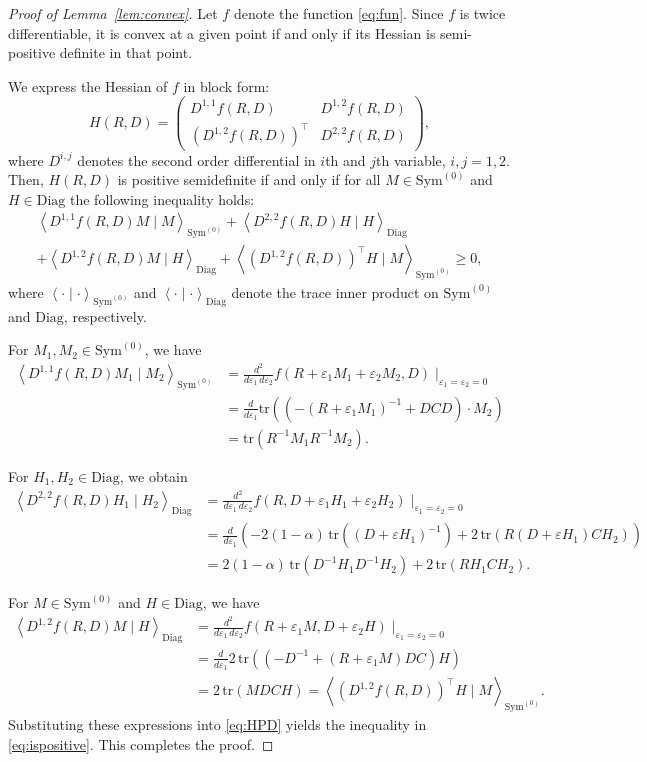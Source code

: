 \documentclass[12pt]{amsart}
\numberwithin{equation}{section}
\numberwithin{equation}{section}
\theoremstyle{plain}
\theoremstyle{definition}
\newcommand{\tr}{\mathrm{tr}}
\newcommand{\Szero}{\mathrm{Sym}^{(0)}}
\newcommand{\Diag}{\mathrm{Diag}}
\begin{document}
\begin{proof}[Proof of Lemma~\ref{lem:convex}]

Let $f$ denote the function \eqref{eq:fun}. Since $f$ is twice differentiable, it is convex at a given point if and only if its Hessian is semi-positive definite in that point. 

We express the Hessian of $f$ in block form:
\[
H(R,D) = \begin{pmatrix}
    D^{1,1} f(R,D) & D^{1,2} f(R,D) \\
    (D^{1,2} f(R,D))^\top  & D^{2,2} f(R,D)
\end{pmatrix},
\]
where $D^{i,j}$ denotes the second order differential in $i$th and $j$th variable, $i,j=1,2$. Then, $H(R,D)$ is positive semidefinite if and only if for all $M\in \Szero$ and $H\in \Diag$ the following inequality holds:
\begin{multline}\label{eq:HPD}
\left< D^{1,1} f(R,D) M\mid M\right>_{\Szero}+\left< D^{2,2} f(R,D) H\mid H\right>_{\Diag} \\
+ \left< D^{1,2} f(R,D) M\mid H\right>_{\Diag}+
\left< (D^{1,2} f(R,D))^\top H\mid M\right>_{\Szero}
\geq 0,
\end{multline}
where $\left<\cdot\mid\cdot\right>_{\Szero}$ and $\left<\cdot\mid\cdot\right>_{\Diag}$ denote the trace inner product on $\Szero$ and $\Diag$, respectively.

For $M_1,M_2\in \Szero$, we have 
\begin{align*}
\left<D^{1,1}f(R,D)M_1\mid M_2\right>_{\Szero}&=\frac{d^2}{d\varepsilon_1\,d\varepsilon_2}f(R+\varepsilon_1 M_1+\varepsilon_2 M_2,D)\mid_{\varepsilon_1=\varepsilon_2=0} \\
&=\frac{d}{d\varepsilon_1} \tr( (-(R+\varepsilon_1 M_1)^{-1}+D C D)\cdot M_2) \\
&= \tr( R^{-1} M_1 R^{-1} M_2). 
\end{align*}

For $H_1, H_2\in \Diag$, we obtain
\begin{align*}
\left<D^{2,2}f(R,D)H_1\mid H_2\right>_{\Diag} &=\frac{d^2}{d\varepsilon_1\,d\varepsilon_2}f(R,D+\varepsilon_1 H_1+\varepsilon_2 H_2)\mid_{\varepsilon_1=\varepsilon_2=0} \\
&= \frac{d}{d \varepsilon_1} \left( -2(1-\alpha)\, \tr( (D+\varepsilon H_1)^{-1})+2\,\tr(R (D+\varepsilon H_1) C H_2)\right)\\
&= 2(1-\alpha)\,\mathrm{tr}( D^{-1}H_1 D^{-1}H_2)+2\,\mathrm{tr}(R H_1 C H_2).
\end{align*}

For $M\in \Szero$ and $H\in \Diag$, we have
\begin{align*}
\left<D^{1,2}f(R,D)M\mid H\right>_{\Diag} &=  \frac{d^2}{d\varepsilon_1\,d\varepsilon_2}f(R+\varepsilon_1 M, D+\varepsilon_2 H)\mid_{\varepsilon_1=\varepsilon_2=0} \\
&=\frac{d}{d\varepsilon_1} 2\, \tr( (- D^{-1}+(R+\varepsilon_1 M) D C) H) \\
&=2\,\tr(M D C H) = \left< (D^{1,2} f(R,D))^\top H\mid M\right>_{\Szero}.
\end{align*}
Substituting these expressions into \eqref{eq:HPD} yields the inequality in \eqref{eq:ispositive}. This completes the proof.
\end{proof}
\end{document}
